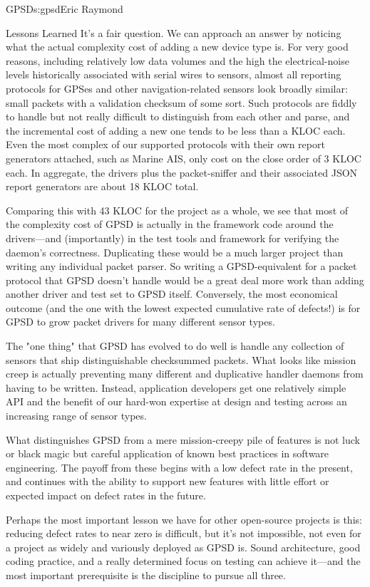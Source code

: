 \begin{aosachapter}{GPSD}{s:gpsd}{Eric Raymond}
\begin{aosasect1}{Lessons Learned}
It's a fair question. We can approach an answer by noticing what the
actual complexity cost of adding a new device type is.  For very good
reasons, including relatively low data volumes and the high the
electrical-noise levels historically associated with serial wires to
sensors, almost all reporting protocols for GPSes and other
navigation-related sensors look broadly similar: small packets with a
validation checksum of some sort.  Such protocols are fiddly to handle
but not really difficult to distinguish from each other and parse, and
the incremental cost of adding a new one tends to be less than a KLOC
each. Even the most complex of our supported protocols with their own
report generators attached, such as Marine AIS, only cost on the close
order of 3 KLOC each. In aggregate, the drivers plus the
packet-sniffer and their associated JSON report generators are about
18 KLOC total.

Comparing this with 43 KLOC for the project as a whole, we see that
most of the complexity cost of GPSD is actually in the framework code
around the drivers---and (importantly) in the test tools and framework
for verifying the daemon's correctness.  Duplicating these would be a
much larger project than writing any individual packet parser.  So
writing a GPSD-equivalent for a packet protocol that GPSD doesn't
handle would be a great deal more work than adding another driver and
test set to GPSD itself.  Conversely, the most economical outcome (and
the one with the lowest expected cumulative rate of defects!) is for
GPSD to grow packet drivers for many different sensor types.

The "one thing" that GPSD has evolved to do well is handle any
collection of sensors that ship distinguishable checksummed packets.
What looks like mission creep is actually preventing many different
and duplicative handler daemons from having to be written.  Instead,
application developers get one relatively simple API and the benefit
of our hard-won expertise at design and testing across an increasing
range of sensor types.

What distinguishes GPSD from a mere mission-creepy pile of features is
not luck or black magic but careful application of known best
practices in software engineering.  The payoff from these begins with
a low defect rate in the present, and continues with the ability to
support new features with little effort or expected impact on defect
rates in the future.

Perhaps the most important lesson we have for other open-source
projects is this: reducing defect rates to near zero is difficult, but
it's not impossible, not even for a project as widely and variously
deployed as GPSD is.  Sound architecture, good coding practice, and a
really determined focus on testing can achieve it---and the most
important prerequisite is the discipline to pursue all three.

\end{aosasect1}

\end{aosachapter}
